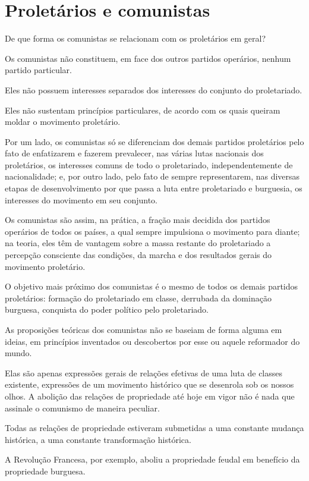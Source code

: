 \section{Proletários e comunistas}

De que forma os comunistas se relacionam com os proletários em geral?

Os comunistas não constituem, em face dos outros partidos operários,
nenhum partido particular.

Eles não possuem interesses separados dos interesses do conjunto do
proletariado.

Eles não sustentam princípios particulares, de acordo com os quais
queiram moldar o movimento proletário.

Por um lado, os comunistas só se diferenciam dos demais partidos
proletários pelo fato de enfatizarem e fazerem prevalecer, nas várias
lutas nacionais dos proletários, os interesses comuns de todo o
proletariado, independentemente de nacionalidade; e, por outro lado,
pelo fato de sempre representarem, nas diversas etapas de
desenvolvimento por que passa a luta entre proletariado e burguesia, os
interesses do movimento em seu conjunto.

Os comunistas são assim, na prática, a fração mais decidida dos partidos
operários de todos os países, a qual sempre impulsiona o movimento para
diante; na teoria, eles têm de vantagem sobre a massa restante do
proletariado a percepção consciente das condições, da marcha e dos
resultados gerais do movimento proletário.

O objetivo mais próximo dos comunistas é o mesmo de todos os demais
partidos proletários: formação do proletariado em classe, derrubada da
dominação burguesa, conquista do poder político pelo proletariado.

As proposições teóricas dos comunistas não se baseiam de forma alguma em
ideias, em princípios inventados ou descobertos por esse ou aquele
reformador do mundo.

Elas são apenas expressões gerais de relações efetivas de uma luta de
classes existente, expressões de um movimento histórico que se
desenrola sob os nossos olhos. A abolição das relações de propriedade
até hoje em vigor não é nada que assinale o comunismo de maneira
peculiar.

Todas as relações de propriedade estiveram submetidas a uma constante
mudança histórica, a uma constante transformação histórica.

A Revolução Francesa, por exemplo, aboliu a propriedade feudal em
benefício da propriedade burguesa.

